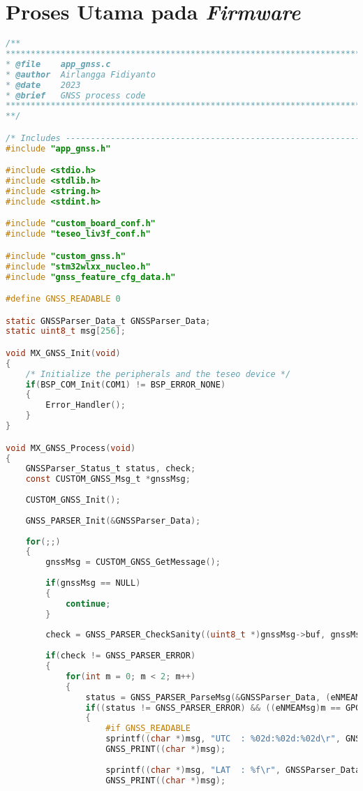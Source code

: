 \section{Proses Utama pada \textit{Firmware}}
\begin{lstlisting}[language=c]
/**
******************************************************************************
* @file    app_gnss.c
* @author  Airlangga Fidiyanto
* @date    2023
* @brief   GNSS process code
******************************************************************************
**/

/* Includes ------------------------------------------------------------------*/
#include "app_gnss.h"

#include <stdio.h>
#include <stdlib.h>
#include <string.h>
#include <stdint.h>

#include "custom_board_conf.h"
#include "teseo_liv3f_conf.h"

#include "custom_gnss.h"
#include "stm32wlxx_nucleo.h"
#include "gnss_feature_cfg_data.h"

#define GNSS_READABLE 0

static GNSSParser_Data_t GNSSParser_Data;
static uint8_t msg[256];

void MX_GNSS_Init(void)
{
	/* Initialize the peripherals and the teseo device */
	if(BSP_COM_Init(COM1) != BSP_ERROR_NONE)
	{
		Error_Handler();
	}
}

void MX_GNSS_Process(void)
{
	GNSSParser_Status_t status, check;
	const CUSTOM_GNSS_Msg_t *gnssMsg;
	
	CUSTOM_GNSS_Init();
	
	GNSS_PARSER_Init(&GNSSParser_Data);
	
	for(;;)
	{
		gnssMsg = CUSTOM_GNSS_GetMessage();
		
		if(gnssMsg == NULL)
		{
			continue;
		}
		
		check = GNSS_PARSER_CheckSanity((uint8_t *)gnssMsg->buf, gnssMsg->len);
		
		if(check != GNSS_PARSER_ERROR)
		{
			for(int m = 0; m < 2; m++)
			{
				status = GNSS_PARSER_ParseMsg(&GNSSParser_Data, (eNMEAMsg)m, (uint8_t *)gnssMsg->buf);
				if((status != GNSS_PARSER_ERROR) && ((eNMEAMsg)m == GPGGA))
				{
					#if GNSS_READABLE
					sprintf((char *)msg, "UTC  : %02d:%02d:%02d\r", GNSSParser_Data.gpgga_data.utc.hh, GNSSParser_Data.gpgga_data.utc.mm, GNSSParser_Data.gpgga_data.utc.ss);
					GNSS_PRINT((char *)msg);
					
					sprintf((char *)msg, "LAT  : %f\r", GNSSParser_Data.gpgga_data.xyz.lat);
					GNSS_PRINT((char *)msg);
					

\end{lstlisting}
